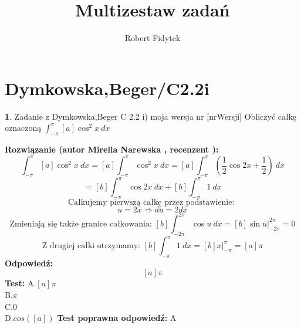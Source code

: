 \documentclass[12pt, a4paper]{article}
\title{Multizestaw zadań}
\author{Robert Fidytek}
\date{}
\theoremstyle{definition} %
\newtheorem{zad}{}
\newcommand{\kategoria}[1]{\section{#1}} %
\newcommand{\zadStart}[1]{\begin{zad}#1\newline} %
\newcommand{\zadStop}{\end{zad}}   %
\newcommand{\rozwStart}[2]{\noindent \textbf{Rozwiązanie (autor #1 , recenzent #2): }\newline} %
\newcommand{\odpStart}{\noindent \textbf{Odpowiedź:}\newline}    %
\newcommand{\odpStop}{\newline}                                             %
\newcommand{\testStart}{\noindent \textbf{Test:}\newline} %
\newcommand{\testStop}{\newline} %
\newcommand{\kluczStart}{\noindent \textbf{Test poprawna odpowiedź:}\newline} %
\newcommand{\kluczStop}{\newline} %
\begin{document}
\maketitle



\kategoria{Dymkowska,Beger/C2.2i}
\zadStart{Zadanie z Dymkowska,Beger C 2.2 i) moja wersja nr [nrWersji]}
Obliczyć całkę oznaczoną $\displaystyle \int_{-\pi}^{\pi} [a]\cos^2{x}  \ dx $
\zadStop
\rozwStart{Mirella Narewska}{}
$$\int_{-\pi}^{\pi} [a]\cos^2{x}  \ dx= [a] \int_{-\pi}^{\pi} \cos^2{x}  \ dx =[a] \int_{-\pi}^{\pi} \left(\frac{1}{2}\cos{2x} + \frac{1}{2} \right) \ dx$$
$$=[b]\int_{-\pi}^{\pi} \cos{2x}  \ dx + [b]\int_{-\pi}^{\pi} 1  \ dx$$
$$\text{Całkujemy pierwszą całkę przez podstawienie: }$$
$$u=2x \Rightarrow du=2 dx $$
$$\text{Zmieniają się także granice całkowania: }[b] \int_{-2\pi}^{2\pi} \cos{u}  \ dx=[b]\sin{u}|_{-2\pi}^{2\pi}=0$$
$$\text{Z drugiej całki otrzymamy: } [b]\int_{-\pi}^{\pi} 1  \ dx=[b]x|_{-\pi}^{\pi}=[a]\pi$$
\odpStart
$$[a]\pi$$
\odpStop
\testStart
A.$[a]\pi$
\\
B.$\pi$
\\
C.$0$
\\
D.$cos([a])$
\testStop
\kluczStart
A
\kluczStop
\end{document}
